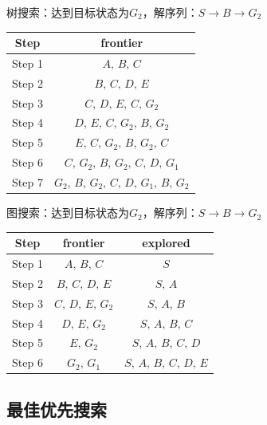 \begin{example}
    \textcolor{main1}{树搜索}：达到目标状态为$G_2$，解序列：$S\to B\to G_2$
    \begin{table}[htbp]
        \centering
        \begin{tabular}{cc}
            \toprule[1.5pt]
            Step & frontier \\
            \midrule[1pt]
            Step 1 & $A,\, B,\, C$ \\
            Step 2 & $B,\, C,\, D,\, E$ \\
            Step 3 & $C,\, D,\, E,\, C,\, G_2$ \\
            Step 4 & $D,\, E,\, C,\, G_2,\, B,\, G_2$ \\
            Step 5 & $E,\, C,\, G_2,\, B,\, G_2,\, C$ \\
            Step 6 & $C,\, G_2,\, B,\, G_2,\, C,\, D,\, G_1$ \\
            Step 7 & $G_2,\, B,\, G_2,\, C,\, D,\, G_1,\, B,\, G_2$ \\
            \bottomrule[1.5pt]
        \end{tabular}%
    \end{table}%
  
    \textcolor{main1}{图搜索}：达到目标状态为$G_2$，解序列：$S\to B\to G_2$
    \begin{table}[htbp]
        \centering
        \begin{tabular}{ccc}
        \toprule[1.5pt]
            Step & frontier & explored \\
            \midrule[1pt]
            Step 1 & $A,\, B,\, C$ & $S$ \\
            Step 2 & $B,\, C,\, D,\, E$ & $S,\, A$ \\
            Step 3 & $C,\, D,\, E,\, G_2$ & $S,\, A,\, B$ \\
            Step 4 & $D,\, E,\, G_2$ & $S,\, A,\, B,\, C$ \\
            Step 5 & $E,\, G_2$ & $S,\, A,\, B,\, C,\, D$ \\
            Step 6 & $G_2,\, G_1$ & $S,\, A,\, B,\, C,\, D,\, E$ \\
        \bottomrule[1.5pt]
        \end{tabular}%
    \end{table}%
\end{example}
\subsection{最佳优先搜索}
